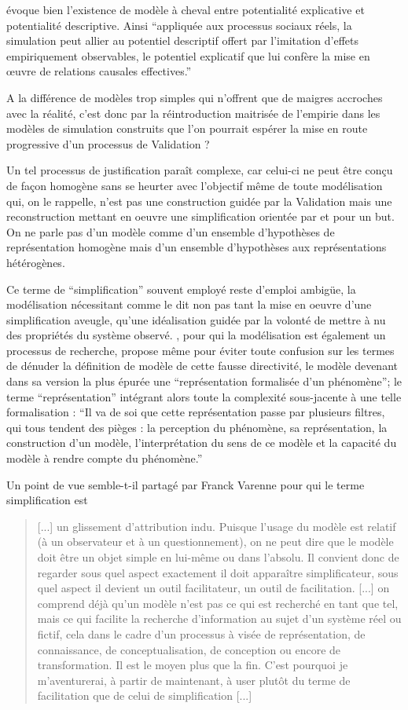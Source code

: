 \textcite{Bulle2005} évoque bien l'existence de modèle à cheval entre potentialité explicative et potentialité descriptive. Ainsi \enquote{appliquée aux processus sociaux réels, la simulation peut allier au potentiel descriptif offert par l’imitation d’effets empiriquement observables, le potentiel explicatif que lui confère la mise en œuvre de relations causales effectives.}

A la différence de modèles trop simples qui n'offrent que de maigres accroches avec la réalité, c'est donc par la réintroduction maitrisée de l'empirie dans les modèles de simulation construits que l'on pourrait espérer la mise en route progressive d'un processus de Validation ?

Un tel processus de justification paraît complexe, car celui-ci ne peut être conçu de façon homogène sans se heurter avec l'objectif même de toute modélisation qui, on le rappelle, n'est pas une construction guidée par la Validation mais une reconstruction mettant en oeuvre une simplification orientée par et pour un but. On ne parle pas d'un modèle comme d'un ensemble d'hypothèses de représentation homogène mais d'un ensemble d'hypothèses aux représentations hétérogènes.

Ce terme de \enquote{simplification} souvent employé reste d'emploi ambigüe, la modélisation nécessitant comme le dit \textcite{Haggett1965} non pas tant la mise en oeuvre d'une simplification aveugle, qu'une idéalisation guidée par la volonté de mettre à nu des propriétés du système observé. \textcite{Brunet2000}, pour qui la modélisation est également un processus de recherche, propose même pour éviter toute confusion sur les termes de dénuder la définition de modèle de cette fausse directivité, le modèle devenant dans sa version la plus épurée une \enquote{représentation formalisée d'un phénomène}; le terme \enquote{représentation} intégrant alors toute la complexité sous-jacente à une telle formalisation : \enquote{Il va de soi que cette représentation passe par plusieurs filtres, qui tous tendent des pièges : la perception du phénomène, sa représentation, la construction d'un modèle, l'interprétation du sens de ce modèle et la capacité du modèle à rendre compte du phénomène.}

Un point de vue semble-t-il partagé par Franck Varenne pour qui le terme simplification est \blockquote[{\cite{Varenne2008}}]{[...] un glissement d’attribution indu. Puisque l’usage du modèle est relatif (à un observateur et à un questionnement), on ne peut dire que le modèle doit être un objet simple en lui-même ou dans l’absolu. Il convient donc de regarder sous quel aspect exactement il doit apparaître simplificateur, sous quel aspect il devient un outil facilitateur, un outil de facilitation. [...] on comprend déjà qu’un modèle n’est pas ce qui est recherché en tant que tel, mais ce qui facilite la recherche d’information au sujet d’un système réel ou fictif, cela dans le cadre d’un processus à visée de représentation, de connaissance, de conceptualisation, de conception ou encore de transformation. Il est le moyen plus que la fin. C’est pourquoi je m’aventurerai, à partir de maintenant, à user plutôt du terme de facilitation que de celui de simplification [...]}

